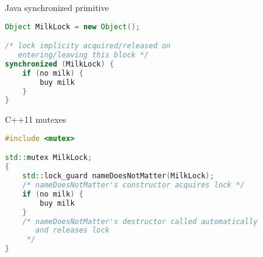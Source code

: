 \begin{frame}[fragile,label=javaSynchronized]{Java synchronized primitive}
\begin{lstlisting}[language=Java,style=small]
Object MilkLock = new Object();

/* lock implicity acquired/released on
   entering/leaving this block */
synchronized (MilkLock) {
    if (no milk) {
        buy milk
    }
}
\end{lstlisting}
\end{frame}

\begin{frame}[fragile,label=cppMutex]{C++11 mutexes}
\begin{lstlisting}[language=C++,style=small]
#include <mutex>

std::mutex MilkLock;
{
    std::lock_guard nameDoesNotMatter(MilkLock);
    /* nameDoesNotMatter's constructor acquires lock */
    if (no milk) {
        buy milk
    }
    /* nameDoesNotMatter's destructor called automatically
       and releases lock
     */
}
\end{lstlisting}
\end{frame}

